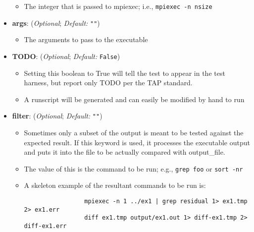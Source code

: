 \begin{itemize}
\begin{itemize}
      \item The integer that is passed to mpiexec; i.e., \lstinline{mpiexec -n nsize}

      \end{itemize}


    \item[]  \textbf{args}: (\emph{Optional}; \emph{Default:} \lstinline{""})

      \begin{itemize}

      \item The arguments to pass to the executable

      \end{itemize}

    \item[]  \textbf{TODO}: (\emph{Optional}; \emph{Default:} \lstinline{False})
      \begin{itemize}

      \item Setting this boolean to True will tell the test to appear in the test harness, but
      report only TODO per the TAP standard.

      \item A runscript will be generated and can easily be modified by hand to run

      \end{itemize}

    \item[]  \textbf{filter}: (\emph{Optional}; \emph{Default:} \lstinline{""})

      \begin{itemize}

      \item Sometimes only a subset of the output is meant to be tested
      against the expected result.  If this keyword is used, it
      processes the executable output and puts it into the file
      to be actually compared with output\_file.

      \item The value of this is the command to be run; e.g., \lstinline{grep foo} or
      \lstinline{sort -nr}

      \item A skeleton example of the resultant commands to be run is:
      \begin{lstlisting}
                 mpiexec -n 1 ../ex1 | grep residual 1> ex1.tmp 2> ex1.err
                 diff ex1.tmp output/ex1.out 1> diff-ex1.tmp 2> diff-ex1.err
      \end{lstlisting}


\end{itemize}
\end{itemize}
